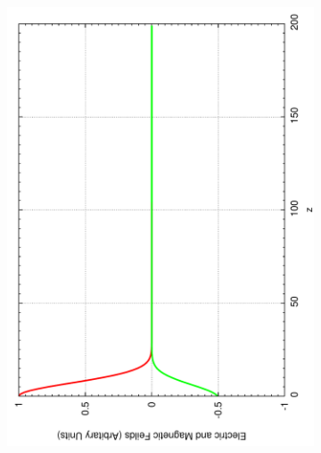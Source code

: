 \begin{figure}[ht]
\begin{subfigure}[ht]{0.45\textwidth}
        \end{subfigure}%
        ~
        \begin{subfigure}[ht]{0.45\textwidth}
                \centering
                \includegraphics[angle=270, width=\textwidth]{initialguass2.pdf}
        \end{subfigure}


\end{figure}
